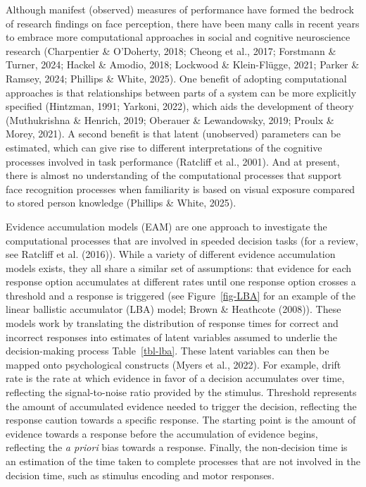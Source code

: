 \documentclass[
  letterpaper,
  DIV=11,
  numbers=noendperiod]{scrartcl}
\begin{document}
Although manifest (observed) measures of performance have formed the
bedrock of research findings on face perception, there have been many
calls in recent years to embrace more computational approaches in social
and cognitive neuroscience research (Charpentier \& O'Doherty, 2018;
Cheong et al., 2017; Forstmann \& Turner, 2024; Hackel \& Amodio, 2018;
Lockwood \& Klein-Flügge, 2021; Parker \& Ramsey, 2024; Phillips \&
White, 2025). One benefit of adopting computational approaches is that
relationships between parts of a system can be more explicitly specified
(Hintzman, 1991; Yarkoni, 2022), which aids the development of theory
(Muthukrishna \& Henrich, 2019; Oberauer \& Lewandowsky, 2019; Proulx \&
Morey, 2021). A second benefit is that latent (unobserved) parameters
can be estimated, which can give rise to different interpretations of
the cognitive processes involved in task performance (Ratcliff et al.,
2001). And at present, there is almost no understanding of the
computational processes that support face recognition processes when
familiarity is based on visual exposure compared to stored person
knowledge (Phillips \& White, 2025).

Evidence accumulation models (EAM) are one approach to investigate the
computational processes that are involved in speeded decision tasks (for
a review, see Ratcliff et al. (2016)). While a variety of different
evidence accumulation models exists, they all share a similar set of
assumptions: that evidence for each response option accumulates at
different rates until one response option crosses a threshold and a
response is triggered (see Figure~\ref{fig-LBA} for an example of the
linear ballistic accumulator (LBA) model; Brown \& Heathcote (2008)).
These models work by translating the distribution of response times for
correct and incorrect responses into estimates of latent variables
assumed to underlie the decision-making process Table~\ref{tbl-lba}.
These latent variables can then be mapped onto psychological constructs
(Myers et al., 2022). For example, drift rate is the rate at which
evidence in favor of a decision accumulates over time, reflecting the
signal-to-noise ratio provided by the stimulus. Threshold represents the
amount of accumulated evidence needed to trigger the decision,
reflecting the response caution towards a specific response. The
starting point is the amount of evidence towards a response before the
accumulation of evidence begins, reflecting the \emph{a priori} bias
towards a response. Finally, the non-decision time is an estimation of
the time taken to complete processes that are not involved in the
decision time, such as stimulus encoding and motor responses.
\end{document}
